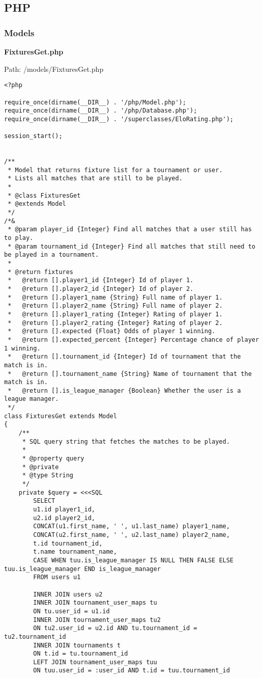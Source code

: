 \newpage
\subsection{PHP}
\subsubsection{Models}
\textbf{FixturesGet.php}\label{FixturesGet.php}

Path: /models/FixturesGet.php
{\scriptsize
\begin{lstlisting}
<?php

require_once(dirname(__DIR__) . '/php/Model.php');
require_once(dirname(__DIR__) . '/php/Database.php');
require_once(dirname(__DIR__) . '/superclasses/EloRating.php');

session_start();


/**
 * Model that returns fixture list for a tournament or user.
 * Lists all matches that are still to be played.
 *
 * @class FixturesGet
 * @extends Model
 */
/*&
 * @param player_id {Integer} Find all matches that a user still has to play.
 * @param tournament_id {Integer} Find all matches that still need to be played in a tournament.
 *
 * @return fixtures
 *   @return [].player1_id {Integer} Id of player 1.
 *   @return [].player2_id {Integer} Id of player 2.
 *   @return [].player1_name {String} Full name of player 1.
 *   @return [].player2_name {String} Full name of player 2.
 *   @return [].player1_rating {Integer} Rating of player 1.
 *   @return [].player2_rating {Integer} Rating of player 2.
 *   @return [].expected {Float} Odds of player 1 winning.
 *   @return [].expected_percent {Integer} Percentage chance of player 1 winning.
 *   @return [].tournament_id {Integer} Id of tournament that the match is in.
 *   @return [].tournament_name {String} Name of tournament that the match is in.
 *   @return [].is_league_manager {Boolean} Whether the user is a league manager.
 */
class FixturesGet extends Model
{
	/**
	 * SQL query string that fetches the matches to be played.
	 *
	 * @property query
	 * @private
	 * @type String
	 */
	private $query = <<<SQL
		SELECT
		u1.id player1_id,
		u2.id player2_id,
		CONCAT(u1.first_name, ' ', u1.last_name) player1_name,
		CONCAT(u2.first_name, ' ', u2.last_name) player2_name,
		t.id tournament_id,
		t.name tournament_name,
		CASE WHEN tuu.is_league_manager IS NULL THEN FALSE ELSE tuu.is_league_manager END is_league_manager
		FROM users u1

		INNER JOIN users u2
		INNER JOIN tournament_user_maps tu
		ON tu.user_id = u1.id
		INNER JOIN tournament_user_maps tu2
		ON tu2.user_id = u2.id AND tu.tournament_id = tu2.tournament_id
		INNER JOIN tournaments t
		ON t.id = tu.tournament_id
		LEFT JOIN tournament_user_maps tuu
		ON tuu.user_id = :user_id AND t.id = tuu.tournament_id


\end{lstlisting}}
